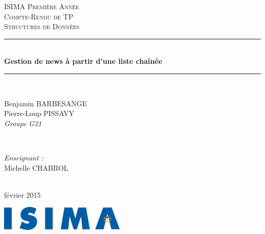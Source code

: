 \begin{titlepage}
  \newcommand{\HRule}{\rule{\linewidth}{0.5mm}}
  \center
  \null{}
  \vspace{3cm}

  \textsc{\LARGE ISIMA Première Année}\\[1.5cm]
  \textsc{\Large Compte-Rendu de TP}\\[0.5cm]
  \textsc{\LARGE Structures de Données}\\[1.5cm]
  \HRule \\[0.4cm]
  { \huge \bfseries Gestion de news à partir d'une liste chaînée}\\
  \HRule \\[1.5cm]

  \begin{minipage}{0.4\textwidth}
    \begin{flushleft} \large
      Benjamin BARBESANGE\\
      Pierre-Loup PISSAVY\\
      {\normalsize\textit{Groupe G21}}
    \end{flushleft}
  \end{minipage}
  ~
  \begin{minipage}{0.4\textwidth}
    \begin{flushright} \large
      \emph{Enseignant :} \\
      Michelle CHABROL
    \end{flushright}
  \end{minipage}\\[4cm]

  {\large février 2015}\\[3cm]

  \vfill

  \includegraphics[width=6cm]{settings/ISIMA_logo.pdf}\\[1cm]
\end{titlepage}
